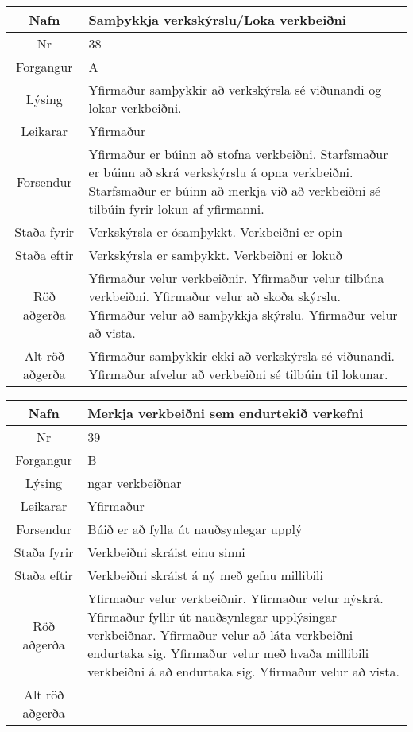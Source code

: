 \caption{Use case 37}\label{tab:use_case_37}
\begin{table}[h!]\centering
\begin{tabular}{|c|p{10cm}|}
\hline
Nafn&Samþykkja verkskýrslu/Loka verkbeiðni\\
\hline
Nr&38\\
\hline
Forgangur&A\\
\hline
Lýsing&Yfirmaður samþykkir að verkskýrsla sé viðunandi og lokar verkbeiðni.\\
\hline
Leikarar&Yfirmaður\\
\hline
Forsendur&Yfirmaður er búinn að stofna verkbeiðni. Starfsmaður er búinn að skrá verkskýrslu á opna verkbeiðni. Starfsmaður er búinn að merkja við að verkbeiðni sé tilbúin fyrir lokun af yfirmanni.\\
\hline
Staða fyrir&Verkskýrsla er ósamþykkt. Verkbeiðni er opin\\
\hline
Staða eftir&Verkskýrsla er samþykkt. Verkbeiðni er lokuð\\
\hline
Röð aðgerða&Yfirmaður velur verkbeiðnir. Yfirmaður velur tilbúna verkbeiðni. Yfirmaður velur að skoða skýrslu. Yfirmaður velur að samþykkja skýrslu. Yfirmaður velur að vista.\\
\hline
Alt röð aðgerða&Yfirmaður samþykkir ekki að verkskýrsla sé viðunandi. Yfirmaður afvelur að verkbeiðni sé tilbúin til lokunar.\\
\hline
\end{tabular}
\end{table}
\caption{Use case 38}\label{tab:use_case_38}
\begin{table}[h!]\centering
\begin{tabular}{|c|p{10cm}|}
\hline
Nafn&Merkja verkbeiðni sem endurtekið verkefni\\
\hline
Nr&39\\
\hline
Forgangur&B\\
\hline
Lýsing&ngar verkbeiðnar\\
\hline
Leikarar&Yfirmaður\\
\hline
Forsendur&Búið er að fylla út nauðsynlegar upplý\\
\hline
Staða fyrir&Verkbeiðni skráist einu sinni\\
\hline
Staða eftir&Verkbeiðni skráist á ný með gefnu millibili\\
\hline
Röð aðgerða&Yfirmaður velur verkbeiðnir. Yfirmaður velur nýskrá. Yfirmaður fyllir út nauðsynlegar upplýsingar verkbeiðnar. Yfirmaður velur að láta verkbeiðni endurtaka sig. Yfirmaður velur með hvaða millibili verkbeiðni á að endurtaka sig. Yfirmaður velur að vista.\\
\hline
Alt röð aðgerða&\\
\hline
\end{tabular}
\end{table}
